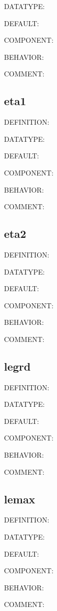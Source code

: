 {\color{green}DATATYPE:}

{\color{blue}DEFAULT:}

{\color{brown}COMPONENT:}

{\color{purple}BEHAVIOR:}

{\color{olive}COMMENT:}

\subsection{eta1}
{\color{red}DEFINITION:}

{\color{green}DATATYPE:}

{\color{blue}DEFAULT:}

{\color{brown}COMPONENT:}

{\color{purple}BEHAVIOR:}

{\color{olive}COMMENT:}

\subsection{eta2}
{\color{red}DEFINITION:}

{\color{green}DATATYPE:}

{\color{blue}DEFAULT:}

{\color{brown}COMPONENT:}

{\color{purple}BEHAVIOR:}

{\color{olive}COMMENT:}

\subsection{legrd}
{\color{red}DEFINITION:}

{\color{green}DATATYPE:}

{\color{blue}DEFAULT:}

{\color{brown}COMPONENT:}

{\color{purple}BEHAVIOR:}

{\color{olive}COMMENT:}

\subsection{lemax}
{\color{red}DEFINITION:}

{\color{green}DATATYPE:}

{\color{blue}DEFAULT:}

{\color{brown}COMPONENT:}

{\color{purple}BEHAVIOR:}

{\color{olive}COMMENT:}

